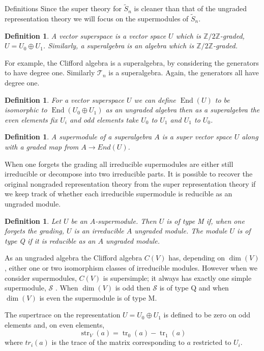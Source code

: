 \documentclass[a4paper,10pt]{amsart}
\newtheorem{definition}[theorem]{Definition}
\DeclareMathOperator{\End}{End}
\DeclareMathOperator{\tr}{tr}
\DeclareMathOperator{\str}{str}
\begin{document}
\begin{section}{Definitions}
Since the super theory for $\tilde{S}_n$ is cleaner than that of the ungraded representation theory we will focus on the supermodules of $\tilde{S}_n$. 
\begin{definition} A vector superspace is a vector space $U$ which is $\mathbb{Z}/2\mathbb{Z}$-graded, $U = U_0 \oplus U_1$. Similarly, a superalgebra is an algebra which is $\mathbb{Z}/2\mathbb{Z}$-graded. \end{definition} 
 For example, the Clifford algebra is a superalgebra, by considering the generators to have degree one. Similarly $\mathcal{T}_n$ is a superalgebra. Again, the generators all have degree one.
 
 \begin{definition}  For a vector superspace $U$ we can define $\End(U)$ to be isomorphic to $\End(U_0 \oplus U_1)$ as an ungraded algebra then as a superalgebra the even elements fix $U_i$ and odd elements take $U_0$ to $U_1$ and $U_1$ to $U_0$. \end{definition}
 \begin{definition} A supermodule of a superalgebra $A$ is a super vector space $U$ along with a graded map from $A \to End(U)$. 
 \end{definition} 
 When one forgets the grading all irreducible supermodules are either still irreducible or decompose into two irreducible parts. It is possible to recover the original nongraded representation theory from the super representation theory if we keep track of whether each irreducible supermodule is reducible as an ungraded module. 
 \begin{definition} Let $U$ be an $A$-supermodule. Then $U$ is of type M if, when one forgets the grading, $U$ is an irreducible $A$ ungraded module. The module $U$ is of type Q if it is reducible as an $A$ ungraded module. \end{definition}   %

As an ungraded algebra the Clifford algebra $C(V)$ has, depending on $\dim(V)$, either one or two isomorphism classes of irreducible modules. However when we consider supermodules, $C(V)$ is supersimple; it always has exactly one simple supermodule, $\mathcal{S}$ \cite[12.2.4]{K05}. When $\dim(V)$ is odd then $\mathcal{S}$ is of type Q and when $\dim(V)$ is even the supermodule is of type M.   

The supertrace on the representation $U= U_0 \oplus U_1$ is defined to be zero on odd elements and, on even elements,
$$\str_V(a) = \tr_0 (a) - \tr_1(a)$$
where $tr_i(a)$ is the trace of the matrix corresponding to $a$ restricted to $U_i$. 


\end{section}
\end{document}
